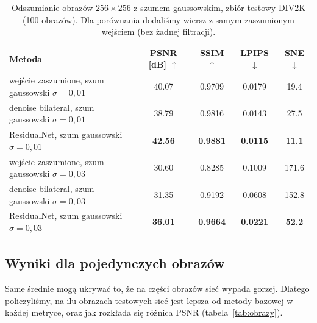 \documentclass[11pt,a4paper]{article}
\newcommand{\best}[1]{\textbf{#1}}
\newcommand{\nazwa}{ResidualNet}
\begin{document}
\begin{table}[H]
  \centering\small
  \caption{Odszumianie obrazów $256\times256$ z szumem gaussowskim, zbiór testowy DIV2K (100 obrazów).
    Dla porównania dodaliśmy wiersz z samym zaszumionym wejściem (bez żadnej filtracji).}
  \label{tab:wyniki-dn}
  \begin{tabular}{@{}lS[table-format=2.2]S[table-format=1.4]S[table-format=1.4]S[table-format=3.1]@{}}
    \toprule
    Metoda & {PSNR [dB] $\uparrow$} & {SSIM $\uparrow$} & {LPIPS $\downarrow$} & {SNE $\downarrow$} \\
    \midrule
    wejście zaszumione, szum gaussowski $\sigma=0{,}01$            & 40.07 & 0.9709 & 0.0179 & 19.4 \\
    denoise bilateral, szum gaussowski $\sigma=0{,}01$             & 38.79 & 0.9816 & 0.0143 & 27.5 \\
    \nazwa, szum gaussowski $\sigma=0{,}01$                         & \best{42.56} & \best{0.9881} & \best{0.0115} & \best{11.1} \\
    \midrule
    wejście zaszumione, szum gaussowski $\sigma=0{,}03$            & 30.60 & 0.8285 & 0.1009 & 171.6 \\
    denoise bilateral, szum gaussowski $\sigma=0{,}03$             & 31.35 & 0.9192 & 0.0608 & 152.8 \\
    \nazwa, szum gaussowski $\sigma=0{,}03$                         & \best{36.01} & \best{0.9664} & \best{0.0221} & \best{52.2} \\
    \bottomrule
  \end{tabular}
\end{table}

\subsection{Wyniki dla pojedynczych obrazów}

Same średnie mogą ukrywać to, że na części obrazów sieć wypada gorzej. Dlatego policzyliśmy, na ilu
obrazach testowych sieć jest lepsza od metody bazowej w każdej metryce, oraz jak rozkłada się różnica
PSNR (tabela~\ref{tab:obrazy}).
\end{document}
